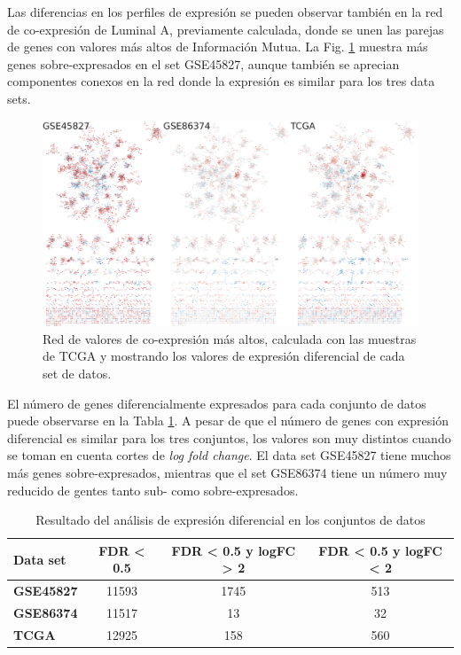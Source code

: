 \documentclass{article}
\begin{document}
Las diferencias en los perfiles de expresión se pueden observar también en la red de co-expresión de Luminal A, previamente calculada, donde se unen las parejas de genes con valores más altos de Información Mutua. La Fig. \ref{fig:networks} muestra más genes sobre-expresados  en el set GSE45827, aunque también se aprecian componentes conexos en la red donde la expresión es similar para los tres data sets.

\begin{figure}
\centering
\includegraphics[scale=0.3]{../figures/networks.png}
\caption{Red de valores de co-expresión más altos, calculada con las muestras de TCGA y mostrando los valores de expresión diferencial de cada set de datos.}
\label{fig:networks}
\end{figure}

El número de genes diferencialmente expresados para cada conjunto de datos puede observarse en la Tabla \ref{table:deg}. A pesar de que el número de genes con expresión diferencial es similar para los tres conjuntos, los valores son muy distintos cuando se toman en cuenta cortes de \textit{log fold change}. El data set GSE45827 tiene muchos más genes sobre-expresados, mientras que el set GSE86374 tiene un número muy reducido de gentes tanto sub- como sobre-expresados.

\begin{table}
\centering
\caption{
{Resultado del análisis de expresión diferencial en los conjuntos de datos}}
\begin{tabular}{|l|c|c|c|} 
\hline
 Data set & FDR < 0.5 & FDR < 0.5 y logFC > 2 &  FDR < 0.5 y logFC < 2\\
\hline
\textbf{GSE45827} & 11593 & 1745 & 513  \\
\hline
\textbf{GSE86374} & 11517 & 13 & 32 \\
\hline
\textbf{TCGA} & 12925 & 158 & 560 \\
\hline
\end{tabular}\\
\label{table:deg}
\end{table}
\end{document}
